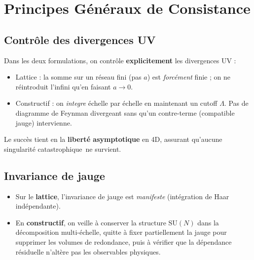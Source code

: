 \vspace{1em}

\section{Principes Généraux de Consistance}
\label{sec:6.2}

\subsection*{Contrôle des divergences UV}
Dans les deux formulations, on contrôle \textbf{explicitement} les divergences UV :
\begin{itemize}
	\item Lattice : la somme sur un réseau fini (pas \(a\)) est \emph{forcément} finie ; on ne réintroduit l’infini qu’en faisant \(a\to 0\).  
	\item Constructif : on \emph{integre} échelle par échelle en maintenant un cutoff \(\Lambda\). Pas de diagramme de Feynman divergeant sans qu’un contre-terme (compatible jauge) intervienne.
\end{itemize}
Le succès tient en la \textbf{liberté asymptotique} en 4D, assurant qu’aucune singularité \og catastrophique\fg\ ne survient.

\subsection*{Invariance de jauge}
\begin{itemize}
	\item Sur le \textbf{lattice}, l’invariance de jauge est \emph{manifeste} (intégration de Haar indépendante).  
	\item En \textbf{constructif}, on veille à conserver la structure \(\mathrm{SU}(N)\) dans la décomposition multi-échelle, quitte à fixer partiellement la jauge pour supprimer les volumes de redondance, puis à vérifier que la dépendance résiduelle n’altère pas les observables physiques.  
\end{itemize}

\vspace{1em}

